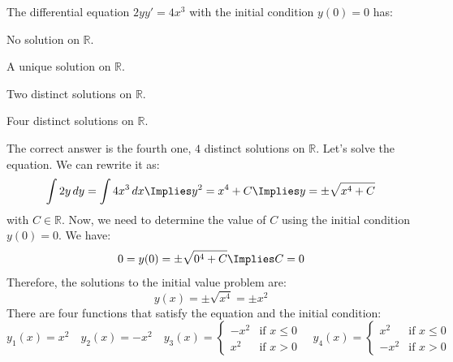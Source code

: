 \begin{exercise}
    The differential equation $2yy' = 4x^3$ with the initial condition $y(0) = 0$ has:
    \begin{citemize}
        \item No solution on $\mathbb{R}$.
        \item A unique solution on $\mathbb{R}$.
        \item Two distinct solutions on $\mathbb{R}$.
        \item Four distinct solutions on $\mathbb{R}$.
    \end{citemize}

    \Answer
    The correct answer is the fourth one, $4$ distinct solutions on $\mathbb{R}$. Let's solve the equation. We can rewrite it as:
    \[
        \int 2y \, dy = \int 4x^3 \, dx \Implies y^2 = x^4 + C \Implies y = \pm \sqrt{x^4 + C}
    \]
    with $C \in \mathbb{R}$. Now, we need to determine the value of $C$ using the initial condition $y(0) = 0$. We have:
    \[
        0 = y(0) = \pm \sqrt{0^4 + C} \Implies C = 0
    \]
    Therefore, the solutions to the initial value problem are:
    \[
        y(x) = \pm \sqrt{x^4} = \pm x^2
    \]
    There are four functions that satisfy the equation and the initial condition:
    \[
        y_1(x) = x^2 \quad y_2(x) = -x^2 \quad y_3(x) = \begin{cases}
            -x^2 & \text{if } x \leq 0 \\
            x^2 & \text{if } x > 0
        \end{cases} \quad y_4(x) = \begin{cases}
            x^2 & \text{if } x \leq 0 \\
            -x^2 & \text{if } x > 0
        \end{cases}
    \]



\end{exercise}
